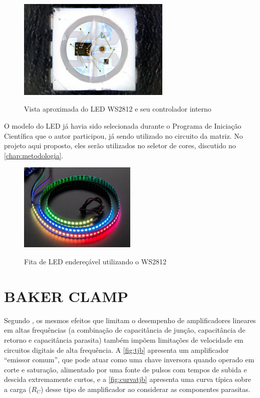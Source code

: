 \begin{figure}[!htb]
    \centering
    \caption{Vista aproximada do LED WS2812 e seu controlador interno}
    \includegraphics[width=0.65\textwidth]{./dados/figuras/ws2812}
    \label{fig:ws2812}
\end{figure}

O modelo do LED já havia sido selecionada durante o Programa de Iniciação Científica que o autor participou, já sendo utilizado no circuito da matriz. No projeto aqui proposto, eles serão utilizados no seletor de cores, discutido no \autoref{chap:metodologia}.

\begin{figure}[H]
    \centering
    \caption{Fita de LED endereçável utilizando o WS2812}
    \includegraphics[width=0.5\textwidth]{./dados/figuras/strip}
    \label{fig:strip}
\end{figure}

\section{BAKER CLAMP}
\label{sec:backerclamp}

Segundo , os mesmos efeitos que limitam o desempenho de amplificadores lineares em altas frequências (a combinação de capacitância de junção, capacitância de retorno e capacitância parasita) também impõem limitações de velocidade em circuitos digitais de alta frequência. A \autoref{fig:tjb} apresenta um amplificador ``emissor comum'', que pode atuar como uma chave inversora quando operado em corte e saturação, alimentado por uma fonte de pulsos com tempos de subida e descida extremamente curtos, e a \autoref{fig:curvatjb} apresenta uma curva típica sobre a carga ($R_{C}$) desse tipo de amplificador ao considerar as componentes parasitas. 

